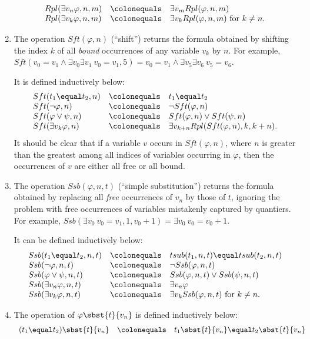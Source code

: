 \begin{enumerate}[1.]
\[\begin{array}{lll}
Rpl(\exists v_n \varphi, n, m) & \colonequals & \exists v_m Rpl(\varphi, n, m) \cr
Rpl(\exists v_k \varphi, n, m) & \colonequals & \exists v_k Rpl(\varphi, n, m) \ \mbox{for \(k \neq n\)}.
\end{array}
\]
%
\item The operation $Sft(\varphi, n)$ (``shift'') returns the formula obtained by shifting the index $k$ of all \emph{bound} occurrences of any variable $v_k$ by $n$. For example, $Sft(v_0 \equal v_1 \land \exists v_0 \exists v_1 \ v_0 \equal v_1, 5) = v_0 \equal v_1 \land \exists v_5 \exists v_6 \ v_5 \equal v_6$.\par
It is defined inductively below:
\[
\begin{array}{lll}
Sft(t_1 \equal t_2, n) & \colonequals & t_1 \equal t_2 \cr
Sft(\neg\varphi, n) & \colonequals & \neg Sft(\varphi, n) \cr
Sft(\varphi \lor \psi, n) & \colonequals & Sft(\varphi, n) \lor Sft(\psi, n) \cr
Sft(\exists v_k \varphi, n) & \colonequals & \exists v_{k + n} Rpl(Sft(\varphi, n), k, k + n).
\end{array}
\]
It should be clear that if a variable $v$ occurs in $Sft(\varphi, n)$, where $n$ is greater than the greatest among all indices of variables occurring in $\varphi$, then the occurrences of $v$ are either all free or all bound.
%
\item The operation $Ssb(\varphi, n, t)$ (``simple substitution'') returns the formula obtained by replacing all \emph{free} occurrences of $v_n$ by those of $t$, ignoring the problem with free occurrences of variables mistakenly captured by quantiers. For example, $Ssb(\exists v_0 \ v_0 \equal v_1, 1, v_0 + 1) = \exists v_0 \ v_0 \equal v_0 + 1$.\par
It can be defined inductively below:
\[
\begin{array}{lll}
Ssb(t_1 \equal t_2, n, t) & \colonequals & tsub(t_1, n, t) \equal tsub(t_2, n, t) \cr
Ssb(\neg\varphi, n, t) & \colonequals & \neg Ssb(\varphi, n, t) \cr
Ssb(\varphi \lor \psi, n, t) & \colonequals & Ssb(\varphi, n, t) \lor Ssb(\psi, n, t) \cr
Ssb(\exists v_n \varphi, n, t) & \colonequals & \exists v_n \varphi \cr
Ssb(\exists v_k \varphi, n, t) & \colonequals & \exists v_k Ssb(\varphi, n, t) \ \mbox{for \(k \neq n\)}.
\end{array}
\]
%
\item The operation of $\varphi\sbst{t}{v_n}$ is defined inductively below:
\[
\begin{array}{lll}
(t_1 \equal t_2)\sbst{t}{v_n} & \colonequals & t_1\sbst{t}{v_n} \equal t_2\sbst{t}{v_n} \cr

\end{array}\]
\end{enumerate}
